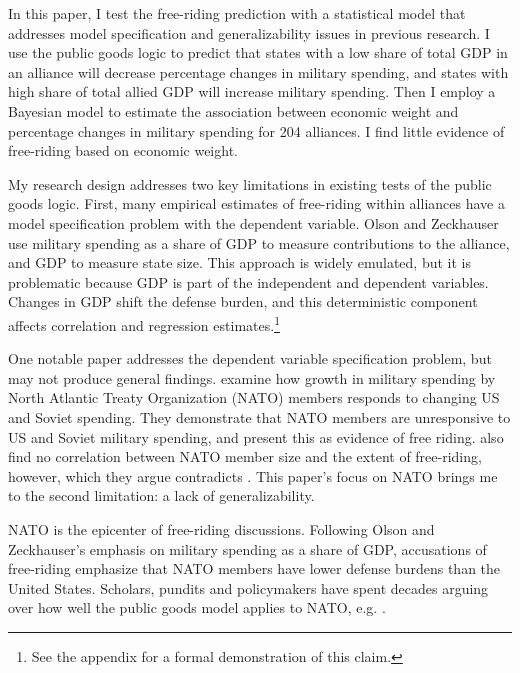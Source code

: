 \documentclass[12pt]{article}
\begin{document}
In this paper, I test the free-riding prediction with a statistical model that addresses model specification and generalizability issues in previous research. 
I use the public goods logic to predict that states with a low share of total GDP in an alliance will decrease percentage changes in military spending, and states with high share of total allied GDP will increase military spending.
Then I employ a Bayesian model to estimate the association between economic weight and percentage changes in military spending for 204 alliances. 
I find little evidence of free-riding based on economic weight.


My research design addresses two key limitations in existing tests of the public goods logic.
First, many empirical estimates of free-riding within alliances have a model specification problem with the dependent variable.
Olson and Zeckhauser use military spending as a share of GDP to measure contributions to the alliance, and GDP to measure state size.
This approach is widely emulated, but it is problematic because GDP is part of the independent and dependent variables.
Changes in GDP shift the defense burden, and this deterministic component affects correlation and regression estimates.\footnote{See the appendix for a formal demonstration of this claim.}  


One notable paper addresses the dependent variable specification problem, but may not produce general findings. 
\citet{PluemperNeumayer2015} examine how growth in military spending by North Atlantic Treaty Organization (NATO) members responds to changing US and Soviet spending.
They demonstrate that NATO members are unresponsive to US and Soviet military spending, and present this as evidence of free riding.
\citet{PluemperNeumayer2015} also find no correlation between NATO member size and the extent of free-riding, however, which they argue contradicts \citet{OlsonZeckhauser1966}.
This paper's focus on NATO brings me to the second limitation: a lack of generalizability. 


NATO is the epicenter of free-riding discussions. 
Following Olson and Zeckhauser's emphasis on military spending as a share of GDP, accusations of free-riding emphasize that NATO members have lower defense burdens than the United States. 
Scholars, pundits and policymakers have spent decades arguing over how well the public goods model applies to NATO, e.g. \citep{Pryor1968, SandlerForbes1980, Palmer1990, HiltonVhu1991, Boyer1993, GatesTerasawa1992, SandlerHartley2001, Lanoszka2015, PluemperNeumayer2015, KimSandler2019}.
\end{document}
